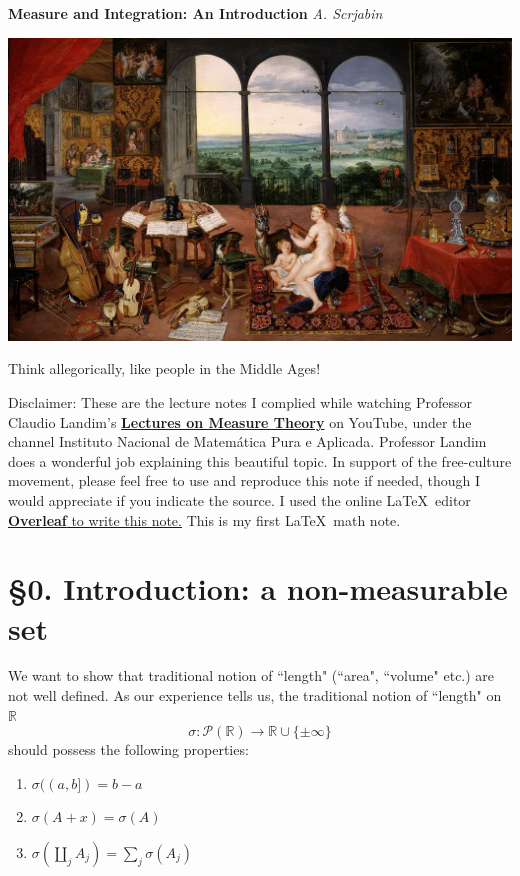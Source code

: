 \documentclass[hidelinks]{article}
\theoremstyle{definition}
\theoremstyle{dotless}
\theoremstyle{remark}
\begin{document}
\begin{titlepage}
   \begin{center}
      \LARGE\textbf{Measure and Integration: An Introduction}\medbreak
      \Large\textsl{A. Scrjabin}\bigbreak
      \centerline{\href{https://en.wikipedia.org/wiki/The_Five_Senses_(series)}{\includegraphics[width=0.6\linewidth]{ee.jpg}}}
      \normalsize{Think allegorically, like people in the Middle Ages!}
      \end{center}
   \tableofcontents
   \bigbreak\bigbreak
   Disclaimer: These are the lecture notes I complied while watching Professor Claudio Landim's \href{https://www.youtube.com/playlist?list=PLo4jXE-LdDTQq8ZyA8F8reSQHej3F6RFX}{\textbf{Lectures on Measure Theory}} on YouTube, under the channel Instituto Nacional de Matemática Pura e Aplicada. Professor Landim does a wonderful job explaining this beautiful topic. In support of the free-culture movement, please feel free to use and reproduce this note if needed, though I would appreciate if you indicate the source. I used the online \LaTeX\  editor \href{https://www.overleaf.com}{\textbf{Overleaf} to write this note.} This is my first \LaTeX\ math note.
\end{titlepage}

\section*{\S0. Introduction: a non-measurable set}
\setcounter{section}{0}

We want to show that traditional notion of ``length" (``area", ``volume" etc.) are not well defined. \bigbreak
As our experience tells us, the traditional notion of ``length" on $\mathbb{R}$
\[
\sigma: \mathscr{P}(\mathbb{R})\to \mathbb{R}\cup\{\pm\infty\}
\]
should possess the following properties:
\begin{enumerate}[label=\arabic*\degree]
    \item $\sigma((a,b])=b-a$
    \item $\sigma(A+x)=\sigma(A)$
    \item $\sigma(\coprod\limits_jA_j)=\sum\limits_j\sigma(A_j)$
\end{enumerate}
\end{document}
